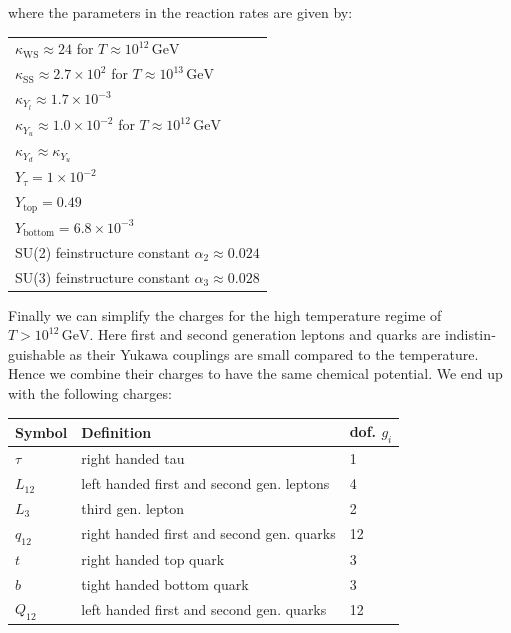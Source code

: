 \documentclass[master,       %
               twoside,        %
               BCOR10mm,       %
               english,ngerman, %
               ]{GAUBM}
\begin{document}
\begin{otherlanguage}{english}
\begin{table}[H]
\end{table}
where the parameters in the reaction rates are given by:
\begin{table}[H]
	\begin{center}
		\begin{tabular}{l}
			$\kappa_\mathrm{WS} \approx 24$ for $T \approx 10^{12} \, \mathrm{GeV}$ \\
			$\kappa_\mathrm{SS} \approx 2.7 \times 10^2$ for $T \approx 10^{13} \, \mathrm{GeV}$ \\
			$\kappa_{Y_l} \approx 1.7 \times 10^{-3}$ \\
			$\kappa_{Y_u} \approx 1.0 \times 10^{-2}$ for $T \approx 10^{12} \, \mathrm{GeV}$ \\
			$\kappa_{Y_d} \approx \kappa_{Y_u}$ \\
			$Y_\tau = 1 \times 10^{-2}$ \\
			$Y_\mathrm{top} = 0.49$ \\
			$Y_\mathrm{bottom} = 6.8 \times 10^{-3}$ \\
			SU(2) feinstructure constant $\alpha_2 \approx 0.024$ \\
			SU(3) feinstructure constant $\alpha_3 \approx 0.028$ \\
		\end{tabular}
	\end{center}
\end{table}
Finally we can simplify the charges for the high temperature regime of $T > 10^{12} \, \mathrm{GeV}$. Here first and second generation leptons and quarks are indistinguishable as their Yukawa couplings are small compared to the temperature.
Hence we combine their charges to have the same chemical potential. We end up with the following charges:
\begin{table}[H]
	\begin{center}
		\begin{tabular}{lll}
			Symbol & Definition & dof. $g_i$ \\
			\hline
			$\tau$ & right handed tau &1  \\
			$L_{12}$ & left handed first and second gen. leptons & 4 \\
			$L_3$ & third gen. lepton& 2 \\
			$q_{12}$ & right handed first and second gen. quarks & 12 \\
			$t$ & right handed top quark & 3 \\
			$b$ & tight handed bottom quark & 3 \\
			$Q_{12}$ & left handed first and second gen. quarks & 12 \\

\end{tabular}
\end{center}
\end{table}
\end{otherlanguage}
\end{document}
